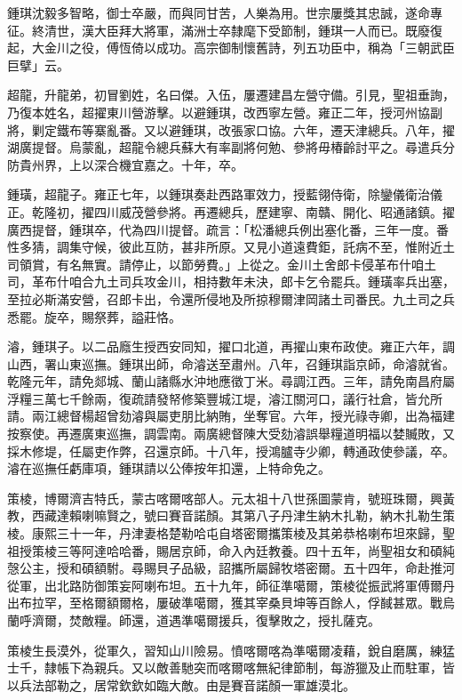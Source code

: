 \begin{pinyinscope}
鍾琪沈毅多智略，御士卒嚴，而與同甘苦，人樂為用。世宗屢獎其忠誠，遂命專征。終清世，漢大臣拜大將軍，滿洲士卒隸麾下受節制，鍾琪一人而已。既廢復起，大金川之役，傅恆倚以成功。高宗御制懷舊詩，列五功臣中，稱為「三朝武臣巨擘」云。

超龍，升龍弟，初冒劉姓，名曰傑。入伍，屢遷建昌左營守備。引見，聖祖垂詢，乃復本姓名，超擢東川營游擊。以避鍾琪，改西寧左營。雍正二年，授河州協副將，剿定鐵布等寨亂番。又以避鍾琪，改張家口協。六年，遷天津總兵。八年，擢湖廣提督。烏蒙亂，超龍令總兵蘇大有率副將何勉、參將毋椿齡討平之。尋遣兵分防貴州界，上以深合機宜嘉之。十年，卒。

鍾璜，超龍子。雍正七年，以鍾琪奏赴西路軍效力，授藍翎侍衛，除鑾儀衛治儀正。乾隆初，擢四川威茂營參將。再遷總兵，歷建寧、南贛、開化、昭通諸鎮。擢廣西提督，鍾琪卒，代為四川提督。疏言：「松潘總兵例出塞化番，三年一度。番性多猜，調集守候，彼此互防，甚非所原。又見小道遠費鉅，託病不至，惟附近土司領賞，有名無實。請停止，以節勞費。」上從之。金川土舍郎卡侵革布什咱土司，革布什咱合九土司兵攻金川，相持數年未決，郎卡乞令罷兵。鍾璜率兵出塞，至拉必斯滿安營，召郎卡出，令還所侵地及所掠穆爾津岡諸土司番民。九土司之兵悉罷。旋卒，賜祭葬，謚莊恪。

濬，鍾琪子。以二品廕生授西安同知，擢口北道，再擢山東布政使。雍正六年，調山西，署山東巡撫。鍾琪出師，命濬送至肅州。八年，召鍾琪詣京師，命濬就省。乾隆元年，請免郯城、蘭山諸縣水沖地應徵丁米。尋調江西。三年，請免南昌府屬浮糧三萬七千餘兩，復疏請發帑修築豐城江堤，濬江關河口，議行社倉，皆允所請。兩江總督楊超曾劾濬與屬吏朋比納賄，坐奪官。六年，授光祿寺卿，出為福建按察使。再遷廣東巡撫，調雲南。兩廣總督陳大受劾濬誤舉糧道明福以婪贓敗，又採木修堤，任屬吏作弊，召還京師。十八年，授鴻臚寺少卿，轉通政使參議，卒。濬在巡撫任虧庫項，鍾琪請以公俸按年扣還，上特命免之。

策棱，博爾濟吉特氏，蒙古喀爾喀部人。元太祖十八世孫圖蒙肯，號班珠爾，興黃教，西藏達賴喇嘛賢之，號曰賽音諾顏。其第八子丹津生納木扎勒，納木扎勒生策棱。康熙三十一年，丹津妻格楚勒哈屯自塔密爾攜策棱及其弟恭格喇布坦來歸，聖祖授策棱三等阿達哈哈番，賜居京師，命入內廷教養。四十五年，尚聖祖女和碩純愨公主，授和碩額駙。尋賜貝子品級，詔攜所屬歸牧塔密爾。五十四年，命赴推河從軍，出北路防御策妄阿喇布坦。五十九年，師征準噶爾，策棱從振武將軍傅爾丹出布拉罕，至格爾額爾格，屢破準噶爾，獲其宰桑貝坤等百餘人，俘馘甚眾。戰烏蘭呼濟爾，焚敵糧。師還，道遇準噶爾援兵，復擊敗之，授扎薩克。

策棱生長漠外，從軍久，習知山川險易。憤喀爾喀為準噶爾凌藉，銳自磨厲，練猛士千，隸帳下為親兵。又以敵善馳突而喀爾喀無紀律節制，每游獵及止而駐軍，皆以兵法部勒之，居常欽欽如臨大敵。由是賽音諾顏一軍雄漠北。


\end{pinyinscope}
